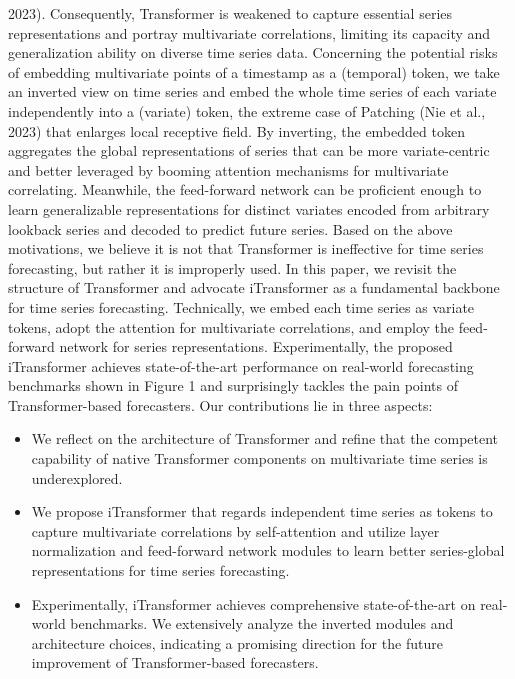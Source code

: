 \documentclass[twoside,12pt]{article}
\begin{document}
2023). Consequently, Transformer is weakened to capture essential series representations and portray
multivariate correlations, limiting its capacity and generalization ability on diverse time series data.
Concerning the potential risks of embedding multivariate points of a timestamp as a (temporal) token,
we take an inverted view on time series and embed the whole time series of each variate independently
into a (variate) token, the extreme case of Patching (Nie et al., 2023) that enlarges local receptive field.
By inverting, the embedded token aggregates the global representations of series that can be more
variate-centric and better leveraged by booming attention mechanisms for multivariate correlating.
Meanwhile, the feed-forward network can be proficient enough to learn generalizable representations
for distinct variates encoded from arbitrary lookback series and decoded to predict future series.
Based on the above motivations, we believe it is not that Transformer is ineffective for time series
forecasting, but rather it is improperly used. In this paper, we revisit the structure of Transformer and
advocate iTransformer as a fundamental backbone for time series forecasting. Technically, we embed
each time series as variate tokens, adopt the attention for multivariate correlations, and employ the
feed-forward network for series representations. Experimentally, the proposed iTransformer achieves
state-of-the-art performance on real-world forecasting benchmarks shown in Figure 1 and surprisingly
tackles the pain points of Transformer-based forecasters. Our contributions lie in three aspects:
\begin{itemize}
    \item We reflect on the architecture of Transformer and refine that the competent capability of
          native Transformer components on multivariate time series is underexplored.
    \item We propose iTransformer that regards independent time series as tokens to capture multivariate correlations by self-attention and utilize layer normalization and feed-forward network
          modules to learn better series-global representations for time series forecasting.
    \item Experimentally, iTransformer achieves comprehensive state-of-the-art on real-world benchmarks. We extensively analyze the inverted modules and architecture choices, indicating a
          promising direction for the future improvement of Transformer-based forecasters.
\end{itemize}
\end{document}
